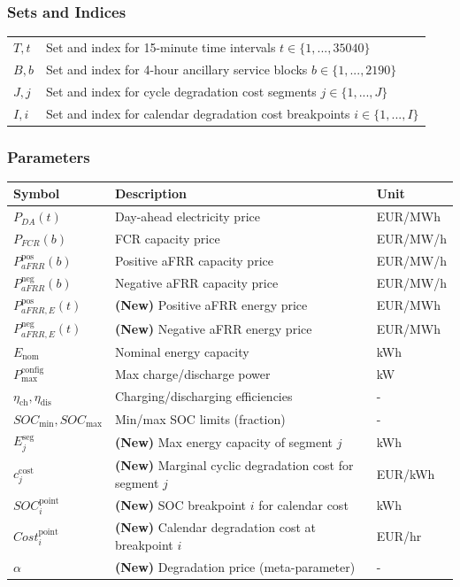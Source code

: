 \documentclass[11pt, a4paper]{article}
\begin{document}
\subsubsection*{Sets and Indices}
\begin{tabular}{@{}ll}
\toprule
$T, t$ & Set and index for 15-minute time intervals $t \in \{1, ..., 35040\}$ \\
$B, b$ & Set and index for 4-hour ancillary service blocks $b \in \{1, ..., 2190\}$ \\
$J, j$ & Set and index for cycle degradation cost segments $j \in \{1, ..., J\}$ \\
$I, i$ & Set and index for calendar degradation cost breakpoints $i \in \{1, ..., I\}$ \\
\bottomrule
\end{tabular}

\subsubsection*{Parameters}
\begin{tabular}{@{}lll}
\toprule
Symbol & Description & Unit \\
\midrule
$P_{DA}(t)$ & Day-ahead electricity price & EUR/MWh \\
$P_{FCR}(b)$ & FCR capacity price & EUR/MW/h \\
$P^{\mathrm{pos}}_{aFRR}(b)$ & Positive aFRR capacity price & EUR/MW/h \\
$P^{\mathrm{neg}}_{aFRR}(b)$ & Negative aFRR capacity price & EUR/MW/h \\
$P^{\mathrm{pos}}_{aFRR,E}(t)$ & \textbf{(New)} Positive aFRR energy price & EUR/MWh \\
$P^{\mathrm{neg}}_{aFRR,E}(t)$ & \textbf{(New)} Negative aFRR energy price & EUR/MWh \\
$E_{\mathrm{nom}}$ & Nominal energy capacity & kWh \\
$P^{\mathrm{config}}_{\max}$ & Max charge/discharge power & kW \\
$\eta_{\mathrm{ch}}, \eta_{\mathrm{dis}}$ & Charging/discharging efficiencies & - \\
$SOC_{\min}, SOC_{\max}$ & Min/max SOC limits (fraction) & - \\
$E^{\mathrm{seg}}_{j}$ & \textbf{(New)} Max energy capacity of segment $j$ & kWh \\
$c^{\mathrm{cost}}_{j}$ & \textbf{(New)} Marginal cyclic degradation cost for segment $j$ & EUR/kWh \\
$SOC^{\mathrm{point}}_i$ & \textbf{(New)} SOC breakpoint $i$ for calendar cost & kWh \\
$Cost^{\mathrm{point}}_i$ & \textbf{(New)} Calendar degradation cost at breakpoint $i$ & EUR/hr \\
$\alpha$ & \textbf{(New)} Degradation price (meta-parameter) & - \\
\bottomrule
\end{tabular}
\end{document}
